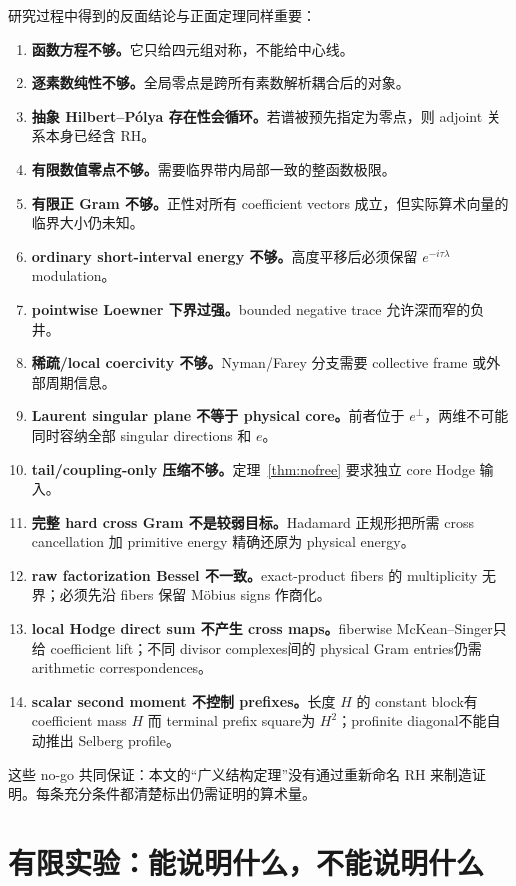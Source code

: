 \documentclass[UTF8,11pt,a4paper]{ctexart}
\theoremstyle{definition}
\theoremstyle{remark}
\newcommand{\1}{\mathbf 1}
\begin{document}
研究过程中得到的反面结论与正面定理同样重要：
\begin{enumerate}
  \item \textbf{函数方程不够。}它只给四元组对称，不能给中心线。
  \item \textbf{逐素数纯性不够。}全局零点是跨所有素数解析耦合后的对象。
  \item \textbf{抽象 Hilbert--P\'olya 存在性会循环。}若谱被预先指定为零点，则 adjoint 关系本身已经含 RH。
  \item \textbf{有限数值零点不够。}需要临界带内局部一致的整函数极限。
  \item \textbf{有限正 Gram 不够。}正性对所有 coefficient vectors 成立，但实际算术向量的临界大小仍未知。
  \item \textbf{ordinary short-interval energy 不够。}高度平移后必须保留 $e^{-i\tau\lambda}$ modulation。
  \item \textbf{pointwise Loewner 下界过强。}bounded negative trace 允许深而窄的负井。
  \item \textbf{稀疏/local coercivity 不够。}Nyman/Farey 分支需要 collective frame 或外部周期信息。
  \item \textbf{Laurent singular plane 不等于 physical core。}前者位于 $e^\perp$，两维不可能同时容纳全部 singular directions 和 $e$。
  \item \textbf{tail/coupling-only 压缩不够。}定理~\ref{thm:nofree} 要求独立 core Hodge 输入。
  \item \textbf{完整 hard cross Gram 不是较弱目标。}Hadamard 正规形把所需 cross cancellation 加 primitive energy 精确还原为 physical energy。
  \item \textbf{raw factorization Bessel 不一致。}exact-product fibers 的 multiplicity 无界；必须先沿 fibers 保留 M\"obius signs 作商化。
  \item \textbf{local Hodge direct sum 不产生 cross maps。}fiberwise McKean--Singer只给 coefficient lift；不同 divisor complexes间的 physical Gram entries仍需 arithmetic correspondences。
  \item \textbf{scalar second moment 不控制 prefixes。}长度 $H$ 的 constant block有 coefficient mass $H$ 而 terminal prefix square为 $H^2$；profinite diagonal不能自动推出 Selberg profile。
\end{enumerate}

这些 no-go 共同保证：本文的“广义结构定理”没有通过重新命名 RH 来制造证明。每条充分条件都清楚标出仍需证明的算术量。

\section{有限实验：能说明什么，不能说明什么}
\end{document}
